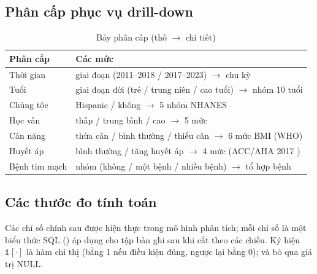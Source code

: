 \subsection{Phân cấp phục vụ drill-down}
\begin{table}[H]
\renewcommand{\arraystretch}{1.35}\setlength{\extrarowheight}{3pt}
\centering
\caption{Bảy phân cấp (thô $\rightarrow$ chi tiết)}
\small
\begin{tabularx}{\textwidth}{|p{3.2cm}|X|}
\hline
\textbf{Phân cấp} & \textbf{Các mức} \\ \hline
Thời gian & giai đoạn (2011--2018 / 2017--2023) $\rightarrow$ chu kỳ \\ \hline
Tuổi & giai đoạn đời (trẻ / trung niên / cao tuổi) $\rightarrow$ nhóm 10 tuổi \\ \hline
Chủng tộc & Hispanic / không $\rightarrow$ 5 nhóm NHANES \\ \hline
Học vấn & thấp / trung bình / cao $\rightarrow$ 5 mức \\ \hline
Cân nặng & thừa cân / bình thường / thiếu cân $\rightarrow$ 6 mức BMI (WHO) \\ \hline
Huyết áp & bình thường / tăng huyết áp $\rightarrow$ 4 mức (ACC/AHA 2017 \cite{acc_aha2017}) \\ \hline
Bệnh tim mạch & nhóm (không / một bệnh / nhiều bệnh) $\rightarrow$ tổ hợp bệnh \\ \hline
\end{tabularx}
\end{table}

\subsection{Các thước đo tính toán}
Các chỉ số chính sau được hiện thực trong mô hình phân tích; mỗi chỉ số là một biểu thức SQL () áp dụng cho tập bản ghi sau khi cắt theo các chiều. Ký hiệu $\mathbb{1}[\cdot]$ là hàm chỉ thị (bằng 1 nếu điều kiện đúng, ngược lại bằng 0);  và  bỏ qua giá trị NULL.

